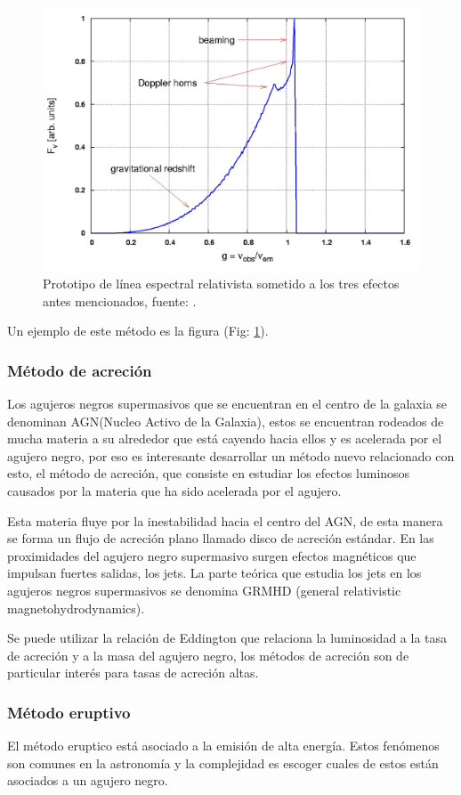 \documentclass{article}
\begin{document}
\begin{figure}[H]
    \centering
    \includegraphics[width=0.6\linewidth]{spectral-relativist_effect.png}
    \caption{Prototipo de línea espectral relativista sometido a los tres efectos antes mencionados, fuente: \cite{muller2007experimental}.}
    \label{fig:spectral-relativist_effect}
\end{figure}

Un ejemplo de este método es la figura (Fig: \ref{fig:spectral-relativist_effect}).

\subsubsection{Método de acreción}
Los agujeros negros supermasivos que se encuentran en el centro de la galaxia se denominan AGN(Nucleo Activo de la Galaxia), estos se encuentran rodeados de mucha materia a su alrededor que está cayendo hacia ellos y es acelerada por el agujero negro, por eso es interesante desarrollar un método nuevo relacionado con esto, el método de acreción, que consiste en estudiar los efectos luminosos causados por la materia que ha sido acelerada por el agujero.\cite{muller2007experimental}

Esta materia fluye por la inestabilidad hacia el centro del AGN, de esta manera se forma un flujo de acreción plano llamado disco de acreción estándar. En las proximidades del agujero negro supermasivo surgen efectos magnéticos que impulsan fuertes salidas, los jets. La parte teórica que estudia los jets en los agujeros negros supermasivos se denomina GRMHD (general relativistic magnetohydrodynamics).\cite{muller2007experimental}

Se puede utilizar la relación de Eddington que relaciona la luminosidad a la tasa de acreción y a la masa del agujero negro, los métodos de acreción son de particular interés para tasas de acreción altas.\cite{muller2007experimental}

\subsubsection{Método eruptivo}
El método eruptico está asociado a la emisión de alta energía. Estos fenómenos son comunes en la astronomía y la complejidad es escoger cuales de estos están asociados a un agujero negro.\cite{muller2007experimental} 
\end{document}

